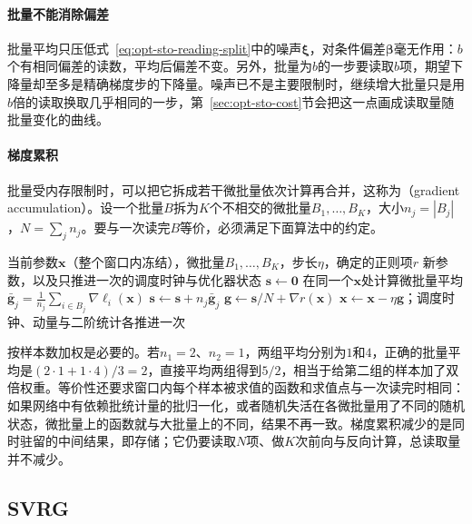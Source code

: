 \paragraph{批量不能消除偏差}
批量平均只压低式~\eqref{eq:opt-sto-reading-split}中的噪声$\bm\xi$，对条件偏差$\bm\beta$毫无作用：$b$个有相同偏差的读数，平均后偏差不变。另外，批量为$b$的一步要读取$b$项，期望下降量却至多是精确梯度步的下降量。噪声已不是主要限制时，继续增大批量只是用$b$倍的读取换取几乎相同的一步，第~\ref{sec:opt-sto-cost}节会把这一点画成读取量随批量变化的曲线。

\paragraph{梯度累积}
批量受内存限制时，可以把它拆成若干微批量依次计算再合并，这称为（gradient accumulation）。设一个批量$B$拆为$K$个不相交的微批量$B_1,\dots,B_K$，大小$n_j=|B_j|$，$N=\sum_jn_j$。要与一次读完$B$等价，必须满足下面算法中的约定。

\begin{algorithm}[梯度累积的一次更新]
\label{alg:opt-sto-accumulation}
\begin{algorithmic}[1]
\Require 当前参数$\bm x$（整个窗口内冻结），微批量$B_1,\dots,B_K$，步长$\eta$，确定的正则项$r$
\Ensure 新参数，以及只推进一次的调度时钟与优化器状态
\State $\bm s\gets\bm0$
  \State 在同一个$\bm x$处计算微批量平均$\bar{\bm g}_j=\frac1{n_j}\sum_{i\in B_j}\nabla\ell_i(\bm x)$
  \State $\bm s\gets\bm s+n_j\bar{\bm g}_j$ 
\EndFor
\State $\bm g\gets\bm s/N+\nabla r(\bm x)$ 
\State $\bm x\gets\bm x-\eta\bm g$；调度时钟、动量与二阶统计各推进一次
\end{algorithmic}
\end{algorithm}

按样本数加权是必要的。若$n_1=2$、$n_2=1$，两组平均分别为$1$和$4$，正确的批量平均是$(2\cdot1+1\cdot4)/3=2$，直接平均两组得到$5/2$，相当于给第二组的样本加了双倍权重。等价性还要求窗口内每个样本被求值的函数和求值点与一次读完时相同：如果网络中有依赖批统计量的批归一化，或者随机失活在各微批量用了不同的随机状态，微批量上的函数就与大批量上的不同，结果不再一致。梯度累积减少的是同时驻留的中间结果，即存储；它仍要读取$N$项、做$K$次前向与反向计算，总读取量并不减少。

\subsection{SVRG}
\label{sec:opt-sto-svrg}

